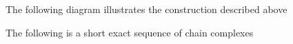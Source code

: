 The following diagram illustrates the construction described above

\def\actson{
  \begin{tikzpicture}[baseline]
    \draw[->](0, 0) arc (-120:180:.5em);
  \end{tikzpicture}
}

\begin{center}
\end{center}

\begin{lemma}
  The following is a short exact sequence of chain complexes
  \begin{center}
  \end{center}
\end{lemma}
